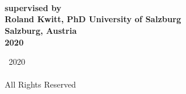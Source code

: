 

\thispagestyle{empty}

\begingroup
\centering
{}
~
\\[1em]
\sffamily\bfseries\fontsize{26}{31.2}\selectfont
\DocumentTitle
\\[0.4in]
\normalfont\large
\Large{\AuthorName}
\vspace{1cm}\\
\normalsize{supervised by}\\
\Large{Roland Kwitt, PhD}
\vfill
University of Salzburg
\\[0.5em]
Salzburg, Austria
\\[1.5em]
2020
\par
\endgroup

\clearpage


\pagestyle{plain}
\setcounter{page}{2}

\begingroup
\centering
{}
\null
\vfill
{\sffamily\textcopyright}~2020
\\[0.5em]
\AuthorName
\\[0.5em]
All Rights Reserved
\par
\endgroup

\clearpage


